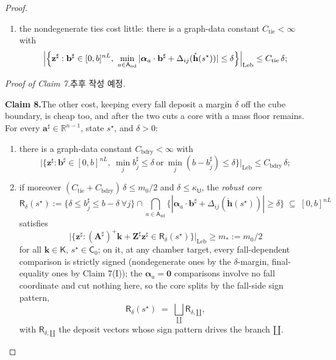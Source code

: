 \documentclass[11pt]{article}
\theoremstyle{definition}
\begin{document}
\begin{proof}
\begin{enumerate}[label=(\Roman*)]
\[    \qquad |\Delta_{ij}(\mathbf{u})| \;\geq\; \kappa_{\mathsf{U}} ;
    \tag{$\ast$}
  \]
  \item the nondegenerate ties cost little: there is a graph-data constant $C_{\mathrm{tie}}<\infty$ with
  \[
    \Bigl|\Bigl\{\mathbf{z}^{\sharp} : \mathbf{b}^{\sharp}\in[0,b]^{nL},\ \min_{a\in\mathsf{A}_{\mathrm{nd}}}|\boldsymbol{\alpha}_a\cdot\mathbf{b}^{\sharp}+\Delta_{ij}(\mathring{\mathbf{h}}(s^{\star}))|\leq\delta\Bigr\}\Bigr|_{\mathrm{Leb}}\leq C_{\mathrm{tie}}\,\delta ;
  \]
\end{enumerate}

\noindent\emph{Proof of Claim 7.}\quad 추후 작성 예정.

\smallskip\noindent\textbf{Claim 8.}\quad The other cost, keeping every fall deposit a margin $\delta$ off the cube boundary, is cheap too, and after the two cuts a core with a mass floor remains. For every $\mathbf{a}^{\sharp}\in\mathbb{R}^{n-1}$, state $s^{\star}$, and $\delta>0$:
\begin{enumerate}[label=(\Roman*)]
  \item there is a graph-data constant $C_{\mathrm{bdry}}<\infty$ with
  \[
    \bigl|\bigl\{\mathbf{z}^{\sharp} : \mathbf{b}^{\sharp}\in[0,b]^{nL},\ \textstyle\min_j b^{\sharp}_j\leq\delta\ \text{or}\ \min_j(b-b^{\sharp}_j)\leq\delta\bigr\}\bigr|_{\mathrm{Leb}}\leq C_{\mathrm{bdry}}\,\delta ;
  \]
  \item if moreover $(C_{\mathrm{tie}}+C_{\mathrm{bdry}})\,\delta\leq m_0/2$ and $\delta\leq\kappa_{\mathsf{U}}$, the \emph{robust core}
  \[
    \mathsf{R}_\delta(s^{\star}) := \{\delta\leq b^{\sharp}_j\leq b-\delta\ \forall j\}\cap\!\!\bigcap_{a\in\mathsf{A}_{\mathrm{nd}}}\!\!\{|\boldsymbol{\alpha}_a\cdot \mathbf{b}^{\sharp}+\Delta_{ij}(\mathring{\mathbf{h}}(s^{\star}))|\geq\delta\} \;\subseteq\; [0,b]^{nL}
  \]
  satisfies
  \[
    \bigl|\{\mathbf{z}^{\sharp} : (\mathbf{A}^{\sharp})^{+}\mathbf{k}+\mathbf{Z}^{\sharp}\mathbf{z}^{\sharp}\in\mathsf{R}_\delta(s^{\star})\}\bigr|_{\mathrm{Leb}}\geq m_* := m_0/2
  \]
  for all $\mathbf{k}\in \mathsf{K}$, $s^{\star}\in \mathsf{C}_0$; on it, at any chamber target, every fall-dependent comparison is strictly signed (nondegenerate ones by the $\delta$-margin, final-equality ones by Claim 7(I)); the $\boldsymbol{\alpha}_a=\mathbf{0}$ comparisons involve no fall coordinate and cut nothing here, so the core splits by the fall-side sign pattern,
  \[
    \mathsf{R}_\delta(s^{\star}) \;=\; \bigsqcup_{\amalg}\mathsf{R}_{\delta,\amalg},
  \]
  with $\mathsf{R}_{\delta,\amalg}$ the deposit vectors whose sign pattern drives the branch $\amalg$.
\end{enumerate}


\end{proof}
\end{document}
